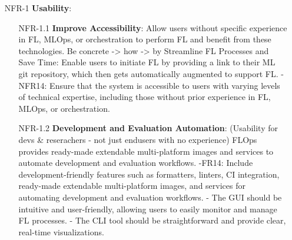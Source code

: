 \begin{itemize}
    \item [NFR-1] {\textbf{Usability}}:
        \begin{itemize}
        \item [NFR-1.1] \textbf{Improve Accessibility}:
            Allow users without specific experience in FL, MLOps, or orchestration to perform FL and benefit from these technologies.
            Be concrete -> how     
            -> by Streamline FL Processes and Save Time:
            Enable users to initiate FL by providing a link to their ML git repository, which then gets automatically augmented to support FL.
            - NFR14: Ensure that the system is accessible to users with varying levels of technical expertise, including those without prior experience in FL, MLOps, or orchestration.
        \item [NFR-1.2] \textbf{Development and Evaluation Automation}: (Usability for devs \& reserachers - not just endusers with no experience)
            FLOps provides ready-made extendable multi-platform images and services to automate development and evaluation workflows.    
            -FR14: Include development-friendly features such as formatters, linters, CI integration, ready-made extendable multi-platform images, and services for automating development and evaluation workflows.
            - The GUI should be intuitive and user-friendly, allowing users to easily monitor and manage FL processes.
            - The CLI tool should be straightforward and provide clear, real-time visualizations.


\end{itemize}
\end{itemize}
